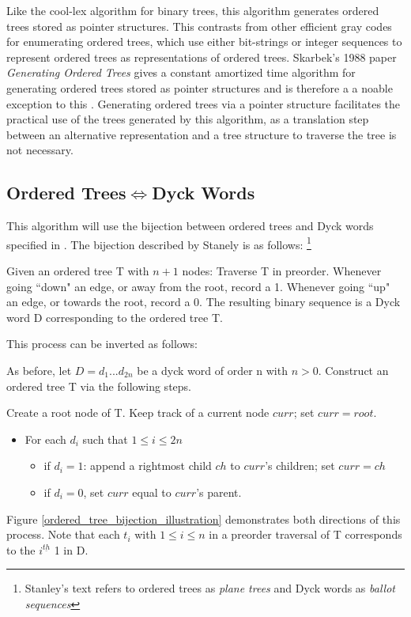Like the cool-lex algorithm for binary trees, this algorithm generates ordered trees stored as pointer structures.  This contrasts from other efficient gray codes for enumerating ordered trees, which use either bit-strings or integer sequences to represent ordered trees \cite{parque2021efficient} \cite{zaks1980lexotrees} \cite{er1985lexotrees} as representations of ordered trees.  Skarbek's 1988 paper \emph{Generating Ordered Trees} gives a constant amortized time algorithm for generating ordered trees stored as pointer structures and is therefore a a noable exception to this \cite{skarbek1988pointerotrees}.
Generating ordered trees via a pointer structure facilitates the practical %
use of the trees generated by this algorithm, as a translation step between an alternative representation and a tree structure to traverse the tree is not necessary.


\subsection{Ordered Trees$\iff$Dyck Words}
This algorithm will use the bijection between ordered trees and Dyck words specified in \cite{stanley2015catalan}. The bijection described by Stanely is as follows:%
\footnote{ Stanley's text refers to ordered trees as \emph{plane trees} and Dyck words as \emph{ballot sequences}} 


Given an ordered tree T with $n+1$ nodes: Traverse T in preorder.  Whenever going ``down" an edge, or away from the root, record a 1.  Whenever going ``up" an edge, or towards the root, record a 0.  The resulting binary sequence is a Dyck word D corresponding to the ordered tree T. 

This process can be inverted as follows: 

As before, let $D=d_1...d_{2n}$ be a dyck word of order n with $n > 0$. Construct an ordered tree T via the following steps. 

Create a root node of T.  Keep track of a current node $curr$; set $curr=root$.

\begin{itemize}
    \item For each $d_i$ such that $1 \le i \le 2n$ %

	\begin{itemize}
	    \item if $d_i=1$: append a rightmost child $ch$ to $curr$'s children; set $curr=ch$
	    \item if $d_i=0$, set $curr$ equal to $curr$'s parent.
	\end{itemize}

\end{itemize}
Figure \ref{ordered_tree_bijection_illustration} demonstrates both directions of this process. Note that each $t_i$ with $1 \le i \le n$ in a preorder traversal of T corresponds to the $i^{\underline{th}}$ 1 in D.

